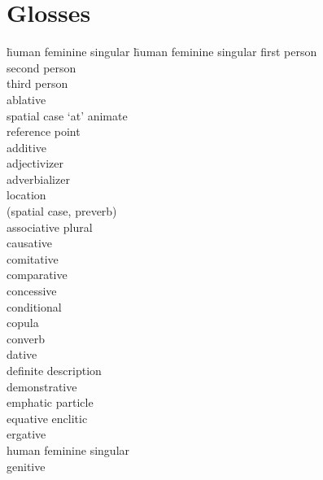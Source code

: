
\section*{Glosses}
	\begin{multicols}{2}
    \largerpage[2]
		\begin{tabbing}
            \hspace{\tabcolsep}\= human feminine singular\kill
{}\hspace{\tabcolsep}\= human feminine singular\kill
				\>	first person\\
				\>	second person\\
				\>	third person\\
				\>	ablative\\
			 \>	spatial case `at' animate \\
			{}		\> reference point\\
				\>	additive\\
				\>	adjectivizer\\
				\>	adverbializer\\
				\>	location \\
			{}		\>	(spatial case, preverb)\\
				\>	associative plural\\
				\>	causative\\
				\>	comitative\\
				\>	comparative\\
				\>	concessive\\
				\>	conditional\\
				\>	copula\\
				\>	converb\\
				\>	dative\\
				\>	definite description\\
				\>	demonstrative\\
				\>	emphatic particle\\
				\>	equative enclitic\\
				\>	ergative\\
				\>	human feminine singular\\
				\>	genitive\\

\end{tabbing}
\end{multicols}
